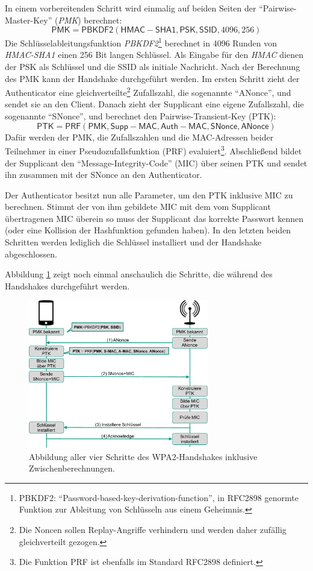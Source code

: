 In einem vorbereitenden Schritt wird einmalig auf beiden Seiten der \enquote{Pairwise-Master-Key} (\textit{PMK}) berechnet:
\[\mathsf{PMK} = \mathsf{PBKDF2}(\mathsf{HMAC-SHA1}, \mathsf{PSK}, \mathsf{SSID}, 4096, 256)\]
Die Schlüsselableitungsfunktion \textit{PBKDF2}\footnote{PBKDF2: \enquote{Password-based-key-derivation-function}, in RFC2898 genormte Funktion zur Ableitung von Schlüsseln aus einem Geheimnis.} berechnet in 4096 Runden von \textit{HMAC-SHA1} einen 256 Bit langen Schlüssel.
Als Eingabe für den \textit{HMAC} dienen der PSK als Schlüssel und die SSID als initiale Nachricht.
Nach der Berechnung des PMK kann der Handshake durchgeführt werden.
Im ersten Schritt zieht der Authenticator eine gleichverteilte\footnote{Die Noncen sollen Replay-Angriffe verhindern und werden daher zufällig gleichverteilt gezogen.} Zufallszahl, die sogenannte \enquote{ANonce}, und sendet sie an den Client.
Danach zieht der Supplicant eine eigene Zufallszahl, die sogenannte \enquote{SNonce}, und berechnet den Pairwise-Transient-Key (PTK):
\[\mathsf{PTK} = \mathsf{PRF}(\mathsf{PMK}, \mathsf{Supp-MAC}, \mathsf{Auth-MAC}, \mathsf{SNonce}, \mathsf{ANonce})\]
Dafür werden der PMK, die Zufallszahlen und die MAC-Adressen beider Teilnehmer in einer Pseudozufallsfunktion (PRF) evaluiert\footnote{Die Funktion PRF ist ebenfalls im Standard RFC2898 definiert.}.
Abschließend bildet der Supplicant den \enquote{Message-Integrity-Code} (MIC) über seinen PTK und sendet ihn zusammen mit der SNonce an den Authenticator.

Der Authenticator besitzt nun alle Parameter, um den PTK inklusive MIC zu berechnen.
Stimmt der von ihm gebildete MIC mit dem vom Supplicant übertragenen MIC überein so muss der Supplicant das korrekte Passwort kennen (oder eine Kollision der Hashfunktion gefunden haben).
In den letzten beiden Schritten werden lediglich die Schlüssel installiert und der Handshake abgeschlossen.

Abbildung \ref{fig:wpa2handshake} zeigt noch einmal anschaulich die Schritte, die während des Handshakes durchgeführt werden.
\begin{figure}[ht]
	\centering
	\includegraphics[width=0.70\textwidth]{graphics/wpa2handshake}
	\caption[WPA2-PSK-Handshake]{Abbildung aller vier Schritte des WPA2-Handshakes inklusive Zwischenberechnungen.}
	\label{fig:wpa2handshake}
\end{figure}

\FloatBarrier